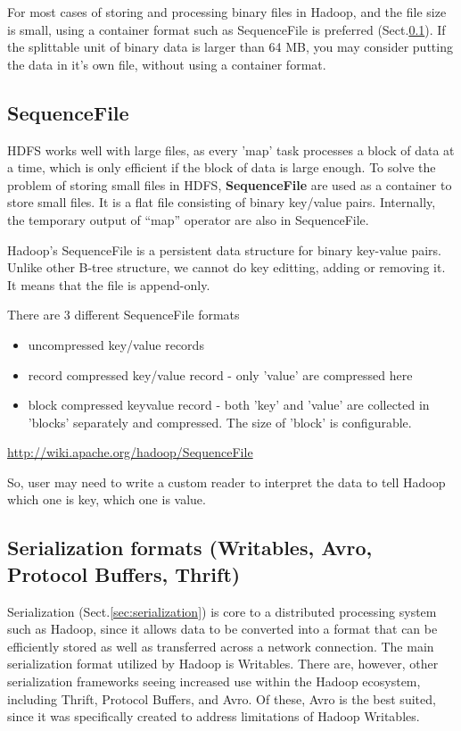 For most cases of storing and processing binary files in Hadoop, and the file
size is small, using a container format such as SequenceFile is preferred
(Sect.\ref{sec:SequenceFile}). If the splittable unit of binary data is larger
than 64 MB, you may consider putting the data in it's own file, without using a
container format.


\subsection{SequenceFile}
\label{sec:SequenceFile}


HDFS works well with large files, as every 'map' task processes a block of data
at a time, which is only efficient if the block of data is large enough.
To solve the problem of storing small files in HDFS, {\bf SequenceFile} are
used as a container to store small files. It is a flat file consisting of binary
key/value pairs. Internally, the temporary output of ``map'' operator are also
in SequenceFile. 

Hadoop's SequenceFile is a persistent data structure for binary key-value pairs.
Unlike other B-tree structure, we cannot do key editting, adding or removing it.
It means that the file is append-only. 

There are 3 different SequenceFile formats
\begin{itemize}
  \item uncompressed key/value records
  \item record compressed key/value record - only 'value' are compressed here
  \item block compressed keyvalue record - both 'key' and 'value' are collected
  in 'blocks' separately and compressed. The size of 'block' is configurable. 
\end{itemize}
\url{http://wiki.apache.org/hadoop/SequenceFile}


So, user may need to write a custom reader to interpret the data to tell Hadoop
which one is key, which one is value. 

\subsection{Serialization formats (Writables, Avro, Protocol Buffers, Thrift)}
\label{sec:Serialization_hadoop}

Serialization (Sect.\ref{sec:serialization}) is core to a distributed processing
system such as Hadoop, since it allows data to be converted into a format that
can be efficiently stored as well as transferred across a network connection. 
The main serialization format utilized by Hadoop is Writables. There are,
however, other serialization frameworks seeing increased use within the Hadoop
ecosystem, including Thrift, Protocol Buffers, and Avro.  Of these, Avro is the
best suited, since it was specifically created to address limitations of Hadoop
Writables.

